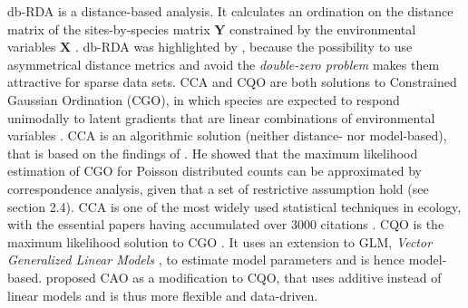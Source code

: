	db-RDA is a distance-based analysis. 
	It calculates an ordination on the distance matrix of the sites-by-species  matrix $\mathbf{Y}$ constrained by the environmental variables $\mathbf{X}$ \citep{Legendre1999, AndersonMati2003}.
	db-RDA was highlighted by \citet{Szocs2015}, because the possibility to use asymmetrical distance metrics and avoid the \textit{double-zero problem } \citep{Legendre2012} makes them attractive for sparse data sets. 
	CCA and CQO are both solutions to Constrained Gaussian Ordination (CGO), in which species are expected to respond unimodally to latent gradients that are linear combinations of environmental variables \citep{gauch1974ordination}. 
	CCA is an algorithmic solution (neither distance- nor model-based), that is based on the findings of \citet{TerBraak1986}. 
	He showed that the maximum likelihood estimation of CGO for Poisson distributed counts can be approximated by correspondence analysis, given that a set of restrictive assumption hold (see section 2.4). 
	CCA is one of the most widely used statistical techniques in ecology, with the essential papers having accumulated over 3000 citations \citep{Braak2014}.
	CQO is the maximum likelihood solution to CGO \citep{Yee2004}. 
	It uses an extension to GLM, \textit{Vector Generalized Linear Models} \citep[VGLM,][]{yee1996vector}, to estimate model parameters and is hence model-based. 
	\citet{Yee2006} proposed CAO as a modification to CQO, that uses additive instead of linear models and is thus more flexible and data-driven. \\
	


